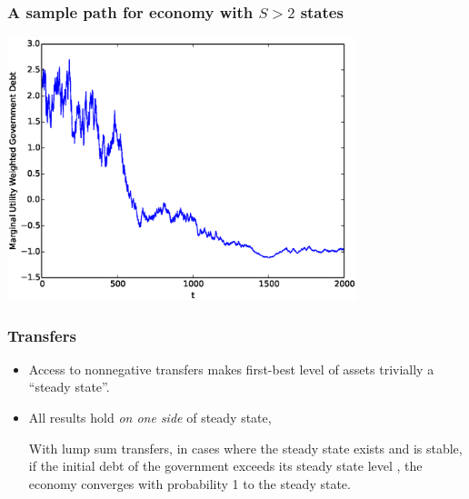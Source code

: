 \documentclass{beamer}
\begin{document}
\subsection{}

\begin{frame}
	\frametitle{A sample path  for economy with $S>2$ states}
	\begin{center}
	\includegraphics[width=4in]{Images/5stateiid.eps}
	\end{center}
\end{frame}



 \begin{frame}
  \frametitle{Transfers}
	\begin{itemize}	
	\item Access to nonnegative transfers makes first-best level of assets trivially a ``steady state''.    	
\item  All results hold \textit{on one side} of steady state,
\begin{theorem}

With lump sum transfers,  in cases where the steady state exists and is stable,  if the initial debt of the government exceeds its steady state level ,  the economy  converges with probability 1 to the steady state.
 
\end{theorem}
		
	\end{itemize}
 \end{frame}
\end{document}
